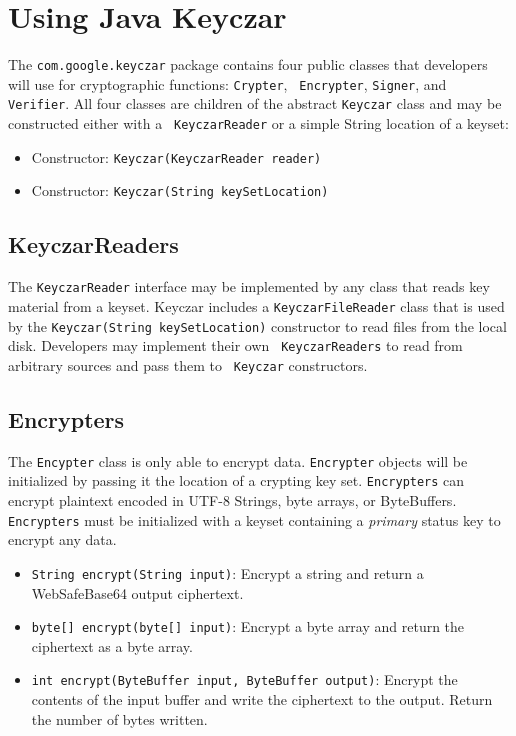 \documentclass{llncs}
\begin{document}
\section{Using Java Keyczar}

The {\tt com.google.keyczar} package contains four public classes that
developers will use for cryptographic functions: {\tt Crypter}, {\tt
Encrypter}, {\tt Signer}, and {\tt Verifier}. All four classes are children
of the abstract {\tt Keyczar} class and may be constructed either with a {\tt
KeyczarReader} or a simple String location of a keyset:
\begin{itemize}
  \item Constructor: {\tt Keyczar(KeyczarReader reader)}
  \item Constructor: {\tt Keyczar(String keySetLocation)}
\end{itemize} 

\subsection{KeyczarReaders}

The {\tt KeyczarReader} interface may be implemented by any class that reads
key material from a keyset. Keyczar includes a {\tt KeyczarFileReader} class
that is used by the {\tt Keyczar(String keySetLocation)} constructor to read
files from the local disk. Developers may implement their own {\tt
KeyczarReaders} to read from arbitrary sources and pass them to {\tt
Keyczar} constructors.

\subsection{Encrypters}

The {\tt Encypter} class is only able to encrypt data. {\tt Encrypter} objects
will be initialized by passing it the location of a crypting key set.
{\tt Encrypters} can encrypt plaintext encoded in UTF-8 Strings, byte arrays, or
ByteBuffers. {\tt Encrypters} must be initialized with a keyset containing a
{\it primary} status key to encrypt any data.
\begin{itemize}
  \item {\tt String encrypt(String input)}: Encrypt a string and return a
  WebSafeBase64 output ciphertext.
  \item {\tt byte[] encrypt(byte[] input)}: Encrypt a byte array and return the
  ciphertext as a byte array.
  \item {\tt int encrypt(ByteBuffer input, ByteBuffer output)}: Encrypt the
  contents of the input buffer and write the ciphertext to the output. Return
  the number of bytes written.
\end{itemize}
\end{document}
